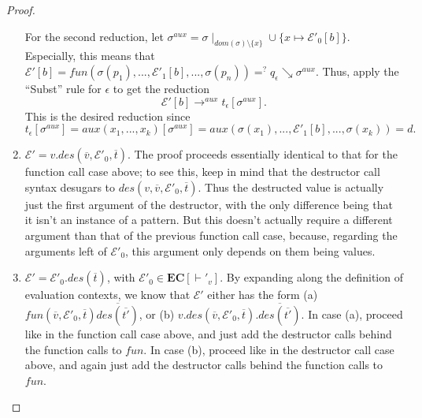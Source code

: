 \begin{lemma}
\begin{proof}
\begin{enumerate}
\begin{prooftree}
\end{prooftree}

For the second reduction, let $\sigma^{aux} = \sigma \mid_{dom(\sigma) \setminus \{x\}} \cup \{x \mapsto \mathcal{E}'_0[b]\}$. Especially, this means that $\mathcal{E}'[b] = fun(\sigma(p_1), ..., \mathcal{E}'_1[b], ..., \sigma(p_n)) =^? q_\epsilon \searrow \sigma^{aux}$. Thus, apply the ``Subst'' rule for $\epsilon$ to get the reduction
\[
\mathcal{E}'[b] \longrightarrow^{aux} t_\epsilon[\sigma^{aux}].
\]
This is the desired reduction since
\[
t_\epsilon[\sigma^{aux}] = aux(x_1, ..., x_k)[\sigma^{aux}] = aux(\sigma(x_1), ..., \mathcal{E}'_1[b], ..., \sigma(x_k)) = d.
\]

\item $\mathcal{E}' = v.des(\overline{v}, \mathcal{E}'_0, \overline{t})$. The proof proceeds essentially identical to that for the function call case above; to see this, keep in mind that the destructor call syntax desugars to $des(v, \overline{v}, \mathcal{E}'_0, \overline{t})$. Thus the destructed value is actually just the first argument of the destructor, with the only difference being that it isn't an instance of a pattern. But this doesn't actually require a different argument than that of the previous function call case, because, regarding the arguments left of $\mathcal{E}'_0$, this argument only depends on them being values.

\item $\mathcal{E}' = \mathcal{E}'_0.des(\overline{t})$, with $\mathcal{E}'_0 \in \mathbf{EC}[\vdash'_v]$. By expanding along the definition of evaluation contexts, we know that $\mathcal{E}'$ either has the form (a) $fun(\overline{v}, \mathcal{E}'_0, \overline{t})\overline{des(\overline{t'})}$, or (b) $v.des(\overline{v}, \mathcal{E}'_0, \overline{t}).\overline{des(\overline{t'})}$. In case (a), proceed like in the function call case above, and just add the destructor calls behind the function calls to $fun$. In case (b), proceed like in the destructor call case above, and again just add the destructor calls behind the function calls to $fun$. \qedhere
\end{enumerate}
\end{proof}
\end{lemma}

